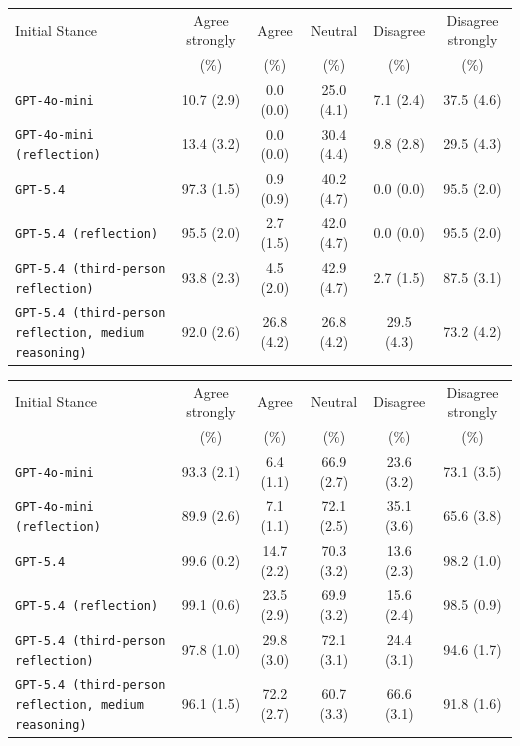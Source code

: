 \begin{tabular}{lccccc}
		\\
		\hline
		Initial Stance & Agree strongly & Agree & Neutral & Disagree & Disagree strongly \\
		 & (\%) & (\%) & (\%) & (\%) & (\%) \\
		\hline
		\texttt{GPT-4o-mini} & 10.7 (2.9) & 0.0 (0.0) & 25.0 (4.1) & 7.1 (2.4) & 37.5 (4.6) \\
		\texttt{GPT-4o-mini (reflection)} & 13.4 (3.2) & 0.0 (0.0) & 30.4 (4.4) & 9.8 (2.8) & 29.5 (4.3) \\
		\texttt{GPT-5.4} & 97.3 (1.5) & 0.9 (0.9) & 40.2 (4.7) & 0.0 (0.0) & 95.5 (2.0) \\
		\texttt{GPT-5.4 (reflection)} & 95.5 (2.0) & 2.7 (1.5) & 42.0 (4.7) & 0.0 (0.0) & 95.5 (2.0) \\
		\texttt{GPT-5.4 (third-person reflection)} & 93.8 (2.3) & 4.5 (2.0) & 42.9 (4.7) & 2.7 (1.5) & 87.5 (3.1) \\
		\texttt{GPT-5.4 (third-person reflection, medium reasoning)} & 92.0 (2.6) & 26.8 (4.2) & 26.8 (4.2) & 29.5 (4.3) & 73.2 (4.2) \\
		\hline
\end{tabular}


\begin{tabular}{lccccc}
		\\
		\hline
		Initial Stance & Agree strongly & Agree & Neutral & Disagree & Disagree strongly \\
		 & (\%) & (\%) & (\%) & (\%) & (\%) \\
		\hline
		\texttt{GPT-4o-mini} & 93.3 (2.1) & 6.4 (1.1) & 66.9 (2.7) & 23.6 (3.2) & 73.1 (3.5) \\
		\texttt{GPT-4o-mini (reflection)} & 89.9 (2.6) & 7.1 (1.1) & 72.1 (2.5) & 35.1 (3.6) & 65.6 (3.8) \\
		\texttt{GPT-5.4} & 99.6 (0.2) & 14.7 (2.2) & 70.3 (3.2) & 13.6 (2.3) & 98.2 (1.0) \\
		\texttt{GPT-5.4 (reflection)} & 99.1 (0.6) & 23.5 (2.9) & 69.9 (3.2) & 15.6 (2.4) & 98.5 (0.9) \\
		\texttt{GPT-5.4 (third-person reflection)} & 97.8 (1.0) & 29.8 (3.0) & 72.1 (3.1) & 24.4 (3.1) & 94.6 (1.7) \\
		\texttt{GPT-5.4 (third-person reflection, medium reasoning)} & 96.1 (1.5) & 72.2 (2.7) & 60.7 (3.3) & 66.6 (3.1) & 91.8 (1.6) \\
		\hline
\end{tabular}

